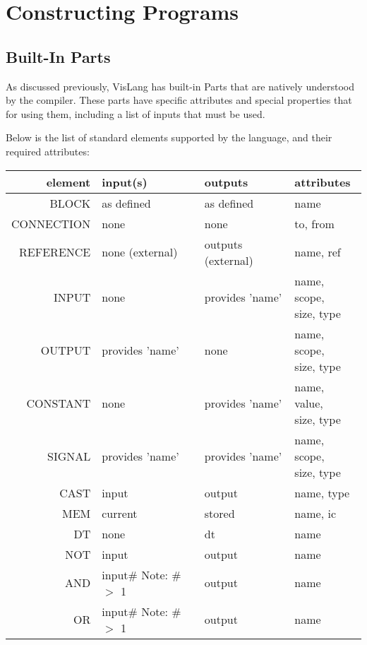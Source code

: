 \section{Constructing Programs}
\subsection{Built-In Parts}
As discussed previously, VisLang has built-in Parts that are natively understood by the compiler.
These parts have specific attributes and special properties that for using them, including a list of inputs that must be used.
\par
Below is the list of standard elements supported by the language, and their required attributes:
\begin{longtable}[c]{ |r|l|l|l| } 
    \hline
    element & input(s) & outputs & attributes \\ 
    \hline
    \hline
    BLOCK & as defined & as defined & name \\ 
    \hline
    CONNECTION & none & none & to, from \\
    \hline
    REFERENCE & none (external) & outputs (external) & name, ref \\ 
    \hline
    \hline
    INPUT & none & provides 'name' & \specialcell{name, scope, \\ size, type} \\ 
    \hline
    OUTPUT & provides 'name' & none & \specialcell{name, scope, \\ size, type} \\ 
    \hline
    CONSTANT & none & provides 'name' & \specialcell{name, value, \\ size, type} \\ 
    \hline
    SIGNAL & provides 'name' & provides 'name' & \specialcell{name, scope, \\ size, type} \\ 
    \hline
    \hline
    CAST & input & output & name, type \\
    \hline
    MEM & current & stored & name, ic \\
    \hline
    DT & none & dt & name \\
    \hline
    NOT & input & output & name \\
    \hline
    AND & \specialcell{input\# \\ Note: \# $>$ 1} & output & name \\
    \hline
    OR & \specialcell{input\# \\ Note: \# $>$ 1} & output & name \\

\end{longtable}
